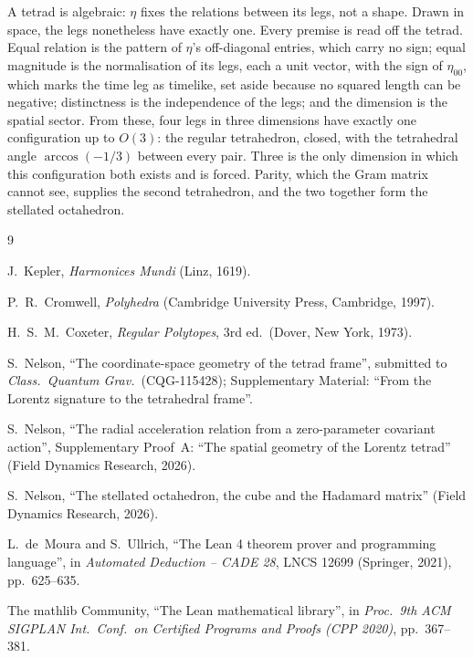 \documentclass[twocolumn]{iopjournal}
\begin{document}
A tetrad is algebraic: $\eta$ fixes the relations between its legs,
not a shape. Drawn in space, the legs nonetheless have exactly one.
Every premise is read off the tetrad. Equal relation is the pattern
of $\eta$'s off-diagonal entries, which carry no sign; equal
magnitude is the normalisation of its legs, each a unit vector, with
the sign of $\eta_{00}$, which marks the time leg as timelike, set
aside because no squared length can be negative; distinctness is the
independence of the legs; and the dimension is
the spatial sector. From these, four
legs in three dimensions have exactly one configuration up to
$O(3)$: the regular tetrahedron, closed, with the tetrahedral angle
$\arccos(-1/3)$ between every pair. Three is the only dimension in
which this configuration both exists and is forced. Parity, which
the Gram matrix cannot see, supplies the second tetrahedron, and
the two together form the stellated octahedron.


{\small
\begin{thebibliography}{9}

J.~Kepler,
\textit{Harmonices Mundi}
(Linz, 1619).

P.~R.~Cromwell,
\textit{Polyhedra}
(Cambridge University Press, Cambridge, 1997).

H.~S.~M.~Coxeter,
\textit{Regular Polytopes},
3rd ed.\ (Dover, New York, 1973).

S.~Nelson,
``The coordinate-space geometry of the tetrad frame'',
submitted to \textit{Class.\ Quantum Grav.}\ (CQG-115428);
Supplementary Material: ``From the Lorentz signature to the
tetrahedral frame''.

S.~Nelson,
``The radial acceleration relation from a zero-parameter covariant
action'', Supplementary Proof~A: ``The spatial geometry of the
Lorentz tetrad'' (Field Dynamics Research, 2026).

S.~Nelson,
``The stellated octahedron, the cube and the Hadamard matrix''
(Field Dynamics Research, 2026).

L.~de~Moura and S.~Ullrich,
``The Lean 4 theorem prover and programming language'',
in \textit{Automated Deduction -- CADE 28},
LNCS 12699 (Springer, 2021), pp.~625--635.

The mathlib Community,
``The Lean mathematical library'',
in \textit{Proc.\ 9th ACM SIGPLAN Int.\ Conf.\ on Certified Programs
and Proofs (CPP 2020)}, pp.~367--381.

\end{thebibliography}
}
\end{document}
